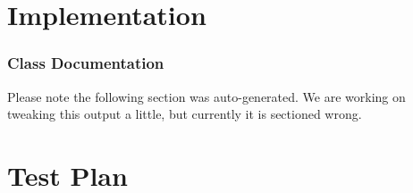 \documentclass{book}
\begin{document}
\chapter*{Implementation}

\subsection{Class Documentation}

Please note the following section was auto-generated. We are working on tweaking this output a little, but currently it is sectioned wrong.

%
%
%
%
%
%
%
%
%
%

\chapter*{Test Plan}
\end{document}
